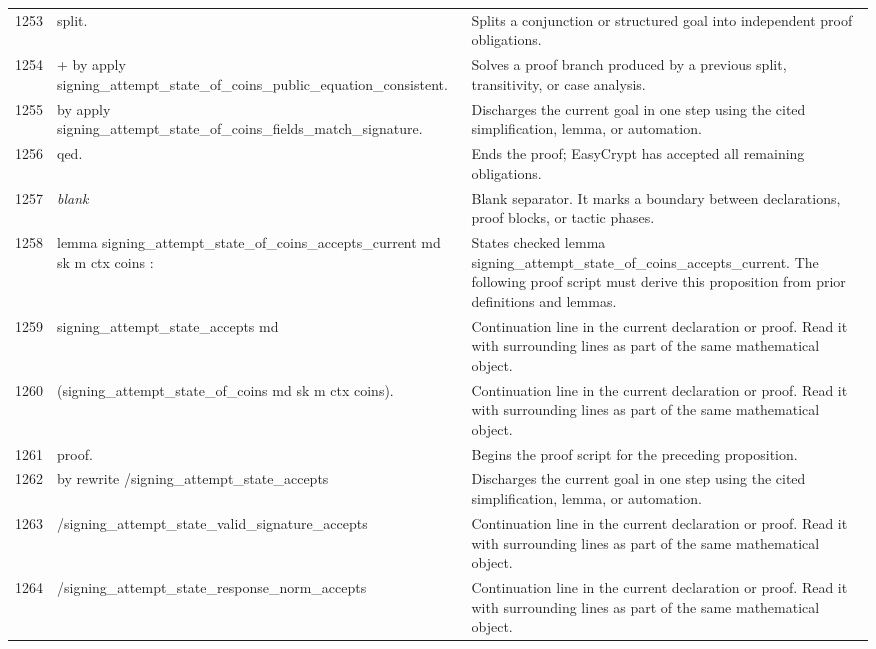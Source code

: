 \documentclass[10pt]{article}
\begin{document}
\begin{longtable}{r L{0.53\textwidth} L{0.37\textwidth}}
1253 & {\ttfamily\scriptsize split.} & Splits a conjunction or structured goal into independent proof obligations. \\
1254 & {\ttfamily\scriptsize + by apply signing\_attempt\_state\_of\_coins\_public\_equation\_consistent.} & Solves a proof branch produced by a previous split, transitivity, or case analysis. \\
1255 & {\ttfamily\scriptsize by apply signing\_attempt\_state\_of\_coins\_fields\_match\_signature.} & Discharges the current goal in one step using the cited simplification, lemma, or automation. \\
1256 & {\ttfamily\scriptsize qed.} & Ends the proof; EasyCrypt has accepted all remaining obligations. \\
1257 & {\ttfamily\scriptsize \emph{blank}} & Blank separator.  It marks a boundary between declarations, proof blocks, or tactic phases. \\
1258 & {\ttfamily\scriptsize lemma signing\_attempt\_state\_of\_coins\_accepts\_current md sk m ctx coins :} & States checked lemma signing\_attempt\_state\_of\_coins\_accepts\_current.  The following proof script must derive this proposition from prior definitions and lemmas. \\
1259 & {\ttfamily\scriptsize   signing\_attempt\_state\_accepts md} & Continuation line in the current declaration or proof.  Read it with surrounding lines as part of the same mathematical object. \\
1260 & {\ttfamily\scriptsize     (signing\_attempt\_state\_of\_coins md sk m ctx coins).} & Continuation line in the current declaration or proof.  Read it with surrounding lines as part of the same mathematical object. \\
1261 & {\ttfamily\scriptsize proof.} & Begins the proof script for the preceding proposition. \\
1262 & {\ttfamily\scriptsize by rewrite /signing\_attempt\_state\_accepts} & Discharges the current goal in one step using the cited simplification, lemma, or automation. \\
1263 & {\ttfamily\scriptsize            /signing\_attempt\_state\_valid\_signature\_accepts} & Continuation line in the current declaration or proof.  Read it with surrounding lines as part of the same mathematical object. \\
1264 & {\ttfamily\scriptsize            /signing\_attempt\_state\_response\_norm\_accepts} & Continuation line in the current declaration or proof.  Read it with surrounding lines as part of the same mathematical object. \\

\end{longtable}
\end{document}
